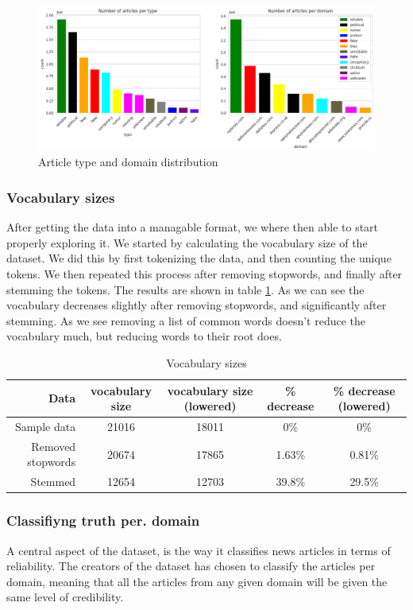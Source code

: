 \begin{figure}[htpb]
  \centering
  \includegraphics[width=1\textwidth]{combdist}
  \caption{Article type and domain distribution}
  \label{fig:combdist}
\end{figure}
\subsubsection{Vocabulary sizes}
After getting the data into a managable format, we where then able to start properly exploring it. We started by
calculating the vocabulary size of the dataset. We did this by first tokenizing the data, and then counting the
unique tokens. We then repeated this process after removing stopwords, and finally after stemming the tokens. The
results are shown in table \ref{tab:vocab_sizes}. As we can see the vocabulary decreases slightly after removing
stopwords, and significantly after stemming. As we see removing a list of common words doesn't reduce the vocabulary
much, but reducing words to their root does.

\begin{table}[h]
    \centering
    \begin{tabular}{r| c | c | c| c}
      Data& vocabulary size & vocabulary size (lowered) & \% decrease & \% decrease (lowered)\\
        \hline
      Sample data& 21016 & 18011 & 0\% & 0\% \\
    \hline
      Removed stopwords & 20674 & 17865 & 1.63\% & 0.81\% \\
    \hline
      Stemmed & 12654 & 12703 & 39.8\% & 29.5\%
    \end{tabular}
    \caption{Vocabulary sizes}
    \label{tab:vocab_sizes}
\end{table}



\subsubsection{Classifiyng truth per. domain}\label{sec:truth_pr_domain}
A central aspect of the dataset, is the way it classifies news articles in terms of reliability. The creators of the
dataset has chosen to classify the articles per domain, meaning that all the articles from any given domain will be
given the same level of credibility.

